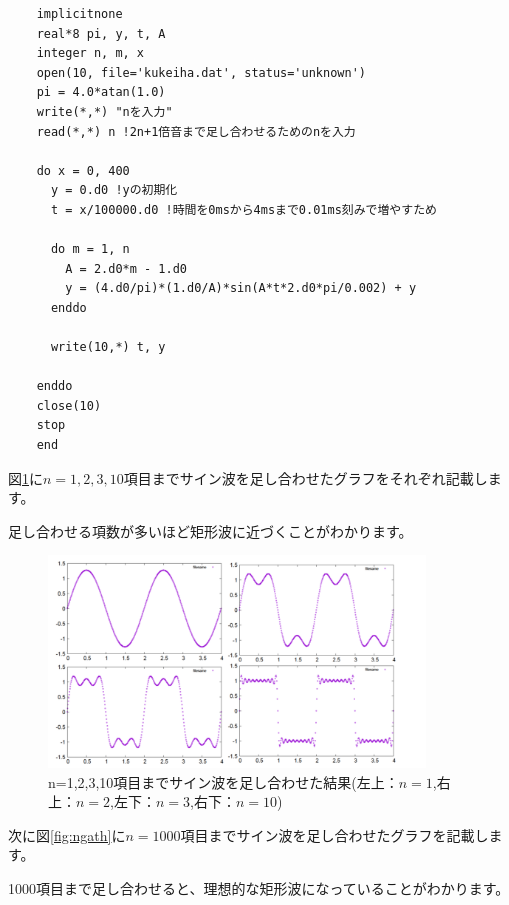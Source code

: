 \documentclass[11pt,b5paper,papersize,dvipdfmx]{jsbook}
\begin{document}
\begin{screen}
\begin{verbatim}
    implicitnone
    real*8 pi, y, t, A
    integer n, m, x
    open(10, file='kukeiha.dat', status='unknown')
    pi = 4.0*atan(1.0)
    write(*,*) "nを入力"
    read(*,*) n !2n+1倍音まで足し合わせるためのnを入力

    do x = 0, 400
      y = 0.d0 !yの初期化
      t = x/100000.d0 !時間を0msから4msまで0.01ms刻みで増やすため

      do m = 1, n
        A = 2.d0*m - 1.d0
        y = (4.d0/pi)*(1.d0/A)*sin(A*t*2.d0*pi/0.002) + y
      enddo

      write(10,*) t, y

    enddo
    close(10)
    stop
    end
\end{verbatim}
\end{screen}

\newpage
図\ref{fig:nhikaku}に$n=1,2,3,10$項目までサイン波を足し合わせたグラフをそれぞれ記載します。\par
足し合わせる項数が多いほど矩形波に近づくことがわかります。
\begin{figure}[H]
  \centering
  \includegraphics[width=10cm]{nsmr/img/n==12310.png}
  \caption{n=1,2,3,10項目までサイン波を足し合わせた結果(左上：$n=1$,右上：$n=2$,左下：$n=3$,右下：$n=10$)}
  \label{fig:nhikaku}
\end{figure}
次に図\ref{fig:ngath}に$n=1000$項目までサイン波を足し合わせたグラフを記載します。\par
1000項目まで足し合わせると、理想的な矩形波になっていることがわかります。
\end{document}
